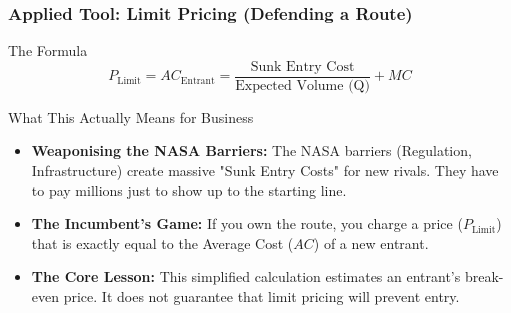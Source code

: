 \documentclass{beamer}
\begin{document}
\begin{frame}[t, shrink=10]
  \frametitle{Applied Tool: Limit Pricing (Defending a Route)}
  
  \begin{block}{The Formula}
  \begin{equation}
      P_{\text{Limit}} = AC_{\text{Entrant}} = \frac{\text{Sunk Entry Cost}}{\text{Expected Volume (Q)}} + MC
  \end{equation}
  \end{block}

  \vspace{0.1cm}
  \begin{block}{What This Actually Means for Business}
  \begin{itemize}
    \item \textbf{Weaponising the NASA Barriers:} The NASA barriers (Regulation, Infrastructure) create massive "Sunk Entry Costs" for new rivals. They have to pay millions just to show up to the starting line.
    \item \textbf{The Incumbent's Game:} If you own the route, you charge a price ($P_{\text{Limit}}$) that is exactly equal to the Average Cost ($AC$) of a new entrant.
    \item \textbf{The Core Lesson:} This simplified calculation estimates an entrant’s break-even price. It does not guarantee that limit pricing will prevent entry.
  \end{itemize}
  \end{block}
\end{frame}
\end{document}
